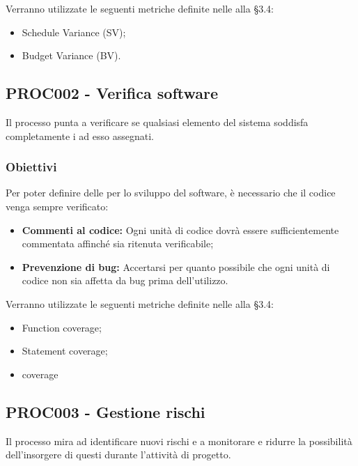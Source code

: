 \documentclass[PianoDiQualifica.tex]{subfiles}
\begin{document}
Verranno utilizzate le seguenti metriche definite nelle \ndp alla \S{3.4}:
\begin{itemize}
	\item {} Schedule Variance (SV);
	\item {} Budget Variance (BV).
\end{itemize}

\subsection{PROC002 - Verifica software}
Il processo punta a verificare se qualsiasi elemento del sistema soddisfa completamente i  ad esso assegnati.
\subsubsection{Obiettivi}
Per poter definire delle  per lo sviluppo del software, è necessario che il codice venga sempre verificato:
\begin{itemize}
	\item \textbf{Commenti al codice:} Ogni unità di codice dovrà essere sufficientemente commentata affinché sia ritenuta verificabile;
	\item \textbf{Prevenzione di bug:} Accertarsi per quanto possibile che ogni unità di codice non sia affetta da bug prima dell'utilizzo.
\end{itemize}
Verranno utilizzate le seguenti metriche definite nelle \ndp alla \S{3.4}:
\begin{itemize}
	\item {} Function coverage;
	\item {} Statement coverage;
	\item {}  coverage
\end{itemize}

	\subsection{PROC003 - Gestione rischi}
Il processo mira ad identificare nuovi rischi e a monitorare e ridurre la possibilità dell'insorgere di questi durante l'attività di progetto.
\end{document}
